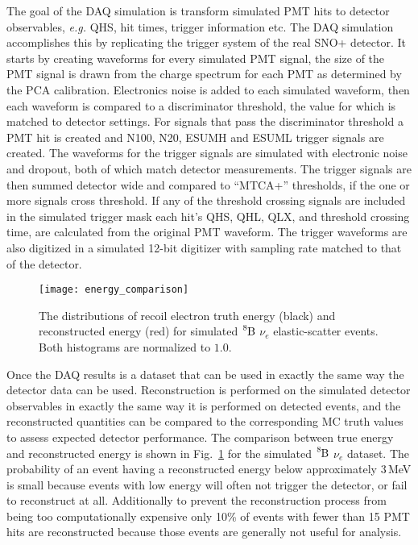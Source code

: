 The goal of the DAQ simulation is transform simulated PMT hits to detector observables,
\textit{e.g.} QHS, hit times, trigger information etc.
The DAQ simulation accomplishes this by replicating the trigger system of the real SNO+ detector.
It starts by creating waveforms for every simulated PMT signal, the size
of the PMT signal is drawn from the charge spectrum for each PMT as determined
by the PCA calibration.
Electronics noise is added to each simulated waveform, then each waveform is compared to a discriminator
threshold, the value for which is matched to detector settings.
For signals that pass the discriminator threshold a PMT hit is created
and N100, N20, ESUMH and ESUML trigger signals are created.
The waveforms for the trigger signals are simulated with electronic noise and dropout, both
of which match detector measurements.
The trigger signals are then summed detector wide and compared to ``MTCA+'' thresholds,
if the one or more signals cross threshold.
If any of the threshold crossing signals are included in the simulated trigger mask
each hit's  QHS, QHL, QLX, and threshold crossing time, are calculated from the original PMT waveform.
The trigger waveforms are also digitized in a simulated 12-bit digitizer with sampling rate matched
to that of the detector.

\begin{figure}[htbp]
  \centering
  \texttt{[image: energy\_comparison]}
  \caption[Reconstructed Energy Vs True Energy]{ The distributions of recoil
  electron truth energy (black) and reconstructed energy (red) for simulated
  $\ce{^{8}B}$ $\nu_{e}$ elastic-scatter events. Both histograms are normalized to $1.0$.} %
  \label{fig:energy_comparison}
\end{figure}

Once the DAQ results is a dataset that can be used in exactly the same way the
detector data can be used.
Reconstruction is performed on the simulated detector observables in exactly the same
way it is performed on detected events, and the reconstructed quantities can be compared
to the corresponding MC truth values to assess expected detector performance.
The comparison between true energy and reconstructed energy is shown in
Fig.~\ref{fig:energy_comparison} for the simulated $\ce{^{8}B}$ $\nu_{e}$
dataset.
The probability of an event having a reconstructed energy below approximately 3\,MeV
is small because events with low energy will often not trigger the detector, or
fail to reconstruct at all.
Additionally to prevent the reconstruction process from being too computationally expensive
only 10\% of events with fewer than 15 PMT hits are reconstructed because
those events are generally not useful for analysis.

